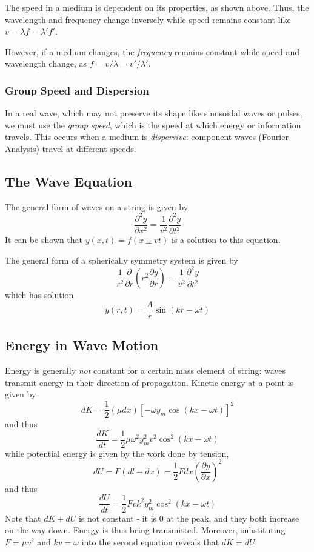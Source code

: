 \documentclass[../PhysicsFormulae.tex]{subfiles}
\begin{document}
The speed in a medium is dependent on its properties, as shown above. Thus, the wavelength and frequency change inversely while speed remains constant like $v = \lambda f = \lambda ' f '$. \bigskip

However, if a medium changes, the \textit{frequency} remains constant while speed and wavelength change, as $f = v / \lambda = v' / \lambda '$.

\subsubsection{Group Speed and Dispersion}
In a real wave, which may not preserve its shape like sinusoidal waves or pulses, we must use the \textit{group speed}, which is the speed at which energy or information travels. This occurs when a medium is \textit{dispersive}: component waves (Fourier Analysis) travel at different speeds. 

\subsection{The Wave Equation}
The general form of waves on a string is given by 
\[ \frac{\partial^2 y}{\partial x^2} = \frac{1}{v^2} \frac{\partial^2 y}{\partial t^2} \]
It can be shown that $y(x,t) = f(x \pm vt)$ is a solution to this equation.\bigskip

The general form of a spherically symmetry system is given by 
\[ \frac{1}{r^2} \frac{\partial}{\partial r} \left(r^2 \frac{\partial y}{\partial r}\right) = \frac{1}{v^2} \frac{\partial^2 y}{\partial t^2} \]
which has solution 
\[ y(r,t) = \frac{A}{r} \sin(kr - \omega t) \]


\subsection{Energy in Wave Motion}
Energy is generally \textit{not} constant for a certain mass element of string: waves transmit energy in their direction of propagation. Kinetic energy at a point is given by
\[ dK = \frac{1}{2} (\mu dx) [-\omega y_m \cos(kx - \omega t)]^2 \]
and thus 
\[ \frac{dK}{dt} = \frac{1}{2} \mu \omega^2 y_m^2 v^2 \cos^2(kx - \omega t) \]
while potential energy is given by the work done by tension,
\[ dU = F(dl - dx) = \frac{1}{2} Fdx \left(\frac{\partial y}{\partial x} \right)^2 \]
and thus
\[ \frac{dU}{dt} = \frac{1}{2} Fvk^2y_m^2\cos^2(kx - \omega t) \]
Note that $dK + dU$ is not constant - it is 0 at the peak, and they both increase on the way down. Energy is thus being transmitted. Moreover, substituting $F = \mu v^2$ and $kv = \omega$ into the second equation reveals that $dK = dU$. 
\end{document}
